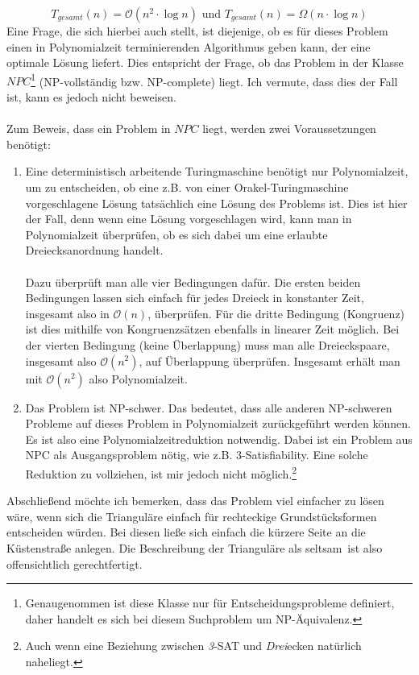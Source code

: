 \documentclass[a4paper, notitlepage, 12pt,headinclude]{scrartcl}
\begin{document}
\begin{equation}
T_{gesamt}(n) = \mathcal{O}(n^2 \cdot \log n) \text{~und~} T_{gesamt}(n) = \Omega(n \cdot \log n)
\end{equation}
 Eine Frage, die sich hierbei auch stellt, ist diejenige, ob es für dieses Problem einen in Polynomialzeit terminierenden Algorithmus geben kann, der eine optimale Lösung liefert. Dies entspricht der Frage, ob das Problem in der Klasse $NPC$\footnote{Genaugenommen ist diese Klasse nur für Entscheidungsprobleme definiert, daher handelt es sich bei diesem Suchproblem um NP-Äquivalenz.} (NP-vollständig bzw. NP-complete) liegt. Ich vermute, dass dies der Fall ist, kann es jedoch nicht beweisen. \\ \\
 Zum Beweis, dass ein Problem in $NPC$ liegt, werden zwei Voraussetzungen benötigt:
 \begin{enumerate}
 	\item Eine deterministisch arbeitende Turingmaschine benötigt nur Polynomialzeit, um zu entscheiden, ob eine z.B. von einer Orakel-Turingmaschine vorgeschlagene Lösung tatsächlich eine Lösung des Problems ist. Dies ist hier der Fall, denn wenn eine Lösung vorgeschlagen wird, kann man in Polynomialzeit überprüfen, ob es sich dabei um eine erlaubte Dreiecksanordnung handelt. \\ \\ Dazu überprüft man alle vier Bedingungen dafür. Die ersten beiden Bedingungen lassen sich einfach für jedes Dreieck in konstanter Zeit, insgesamt also in $\mathcal{O}(n)$, überprüfen. Für die dritte Bedingung (Kongruenz) ist dies mithilfe von Kongruenzsätzen ebenfalls in linearer Zeit möglich. Bei der vierten Bedingung  (keine Überlappung) muss man alle Dreieckspaare, insgesamt also $\mathcal{O}(n^2)$, auf Überlappung überprüfen. Insgesamt erhält man mit $\mathcal{O}(n^2)$ also Polynomialzeit.
 	\item Das Problem ist NP-schwer. Das bedeutet, dass alle anderen NP-schweren Probleme auf dieses Problem in Polynomialzeit zurückgeführt werden können. Es ist also eine Polynomialzeitreduktion notwendig. Dabei ist ein Problem aus NPC als Ausgangsproblem nötig, wie z.B. 3-Satisfiability. Eine solche Reduktion zu vollziehen, ist mir jedoch nicht möglich.\footnote{Auch wenn eine Beziehung zwischen \textit{3}-SAT und \textit{Drei}ecken natürlich naheliegt.}
 \end{enumerate}
Abschließend möchte ich bemerken, dass das Problem viel einfacher zu lösen wäre, wenn sich die Trianguläre einfach für rechteckige Grundstücksformen entscheiden würden. Bei diesen ließe sich einfach die kürzere Seite an die Küstenstraße anlegen. Die Beschreibung der Trianguläre als \glqq seltsam\grqq~ist also offensichtlich gerechtfertigt.
\end{document}
